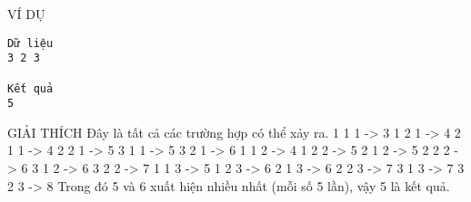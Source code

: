 VÍ DỤ
\begin{verbatim}
Dữ liệu
3 2 3

Kết quả
5
\end{verbatim}
GIẢI THÍCH
Đây là tất cả các trường hợp có thể xảy ra. 1 1 1 -> 3  1 2 1 -> 4  2 1 1 -> 4  2 2 1 -> 5  3 1 1 -> 5  3 2 1 -> 6 1 1 2 -> 4  1 2 2 -> 5  2 1 2 -> 5  2 2 2 -> 6  3 1 2 -> 6  3 2 2 -> 7 1 1 3 -> 5  1 2 3 -> 6  2 1 3 -> 6  2 2 3 -> 7  3 1 3 -> 7  3 2 3 -> 8 Trong đó 5 và 6 xuất hiện nhiều nhất (mỗi số 5 lần), vậy 5 là kết quả.